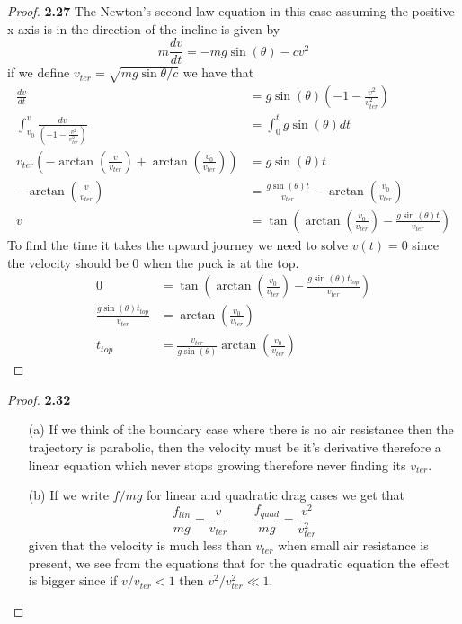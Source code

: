 \documentclass[11pt]{article}
\theoremstyle{definition}
\begin{document}
    \begin{proof}{\textbf{2.27}}
        The Newton's second law equation in this case assuming the positive
        x-axis is in the direction of the incline is given by
        $$m\frac{dv}{dt} = -mg\sin(\theta) - cv^2$$
        if we define $v_{ter} = \sqrt{mg\sin{\theta}/c}$ we have that
        \begin{align*}
            \frac{dv}{dt} &= g\sin(\theta)\left(-1 - \frac{v^2}{v_{ter}^2}\right)\\
            \int_{v_0}^v\frac{dv}{\left(-1 - \frac{v^2}{v_{ter}^2}\right)}
                &= \int_{0}^tg\sin(\theta)dt\\
            v_{ter}\left(-\arctan(\frac{v}{v_{ter}}) + \arctan(\frac{v_{0}}{v_{ter}})\right)
                &= g\sin(\theta)t\\
            -\arctan(\frac{v}{v_{ter}}) &= \frac{g\sin(\theta)t}{v_{ter}} - \arctan(\frac{v_0}{v_{ter}})\\
            v &= \tan(\arctan(\frac{v_0}{v_{ter}}) - \frac{g\sin(\theta)t}{v_{ter}})
        \end{align*}
        To find the time it takes the upward journey we need to solve $v(t)=0$
        since the velocity should be $0$ when the puck is at the top.
        \begin{align*}
            0 &= \tan(\arctan(\frac{v_0}{v_{ter}}) - \frac{g\sin(\theta)t_{top}}{v_{ter}})\\
            \frac{g\sin(\theta)t_{top}}{v_{ter}} &= \arctan(\frac{v_0}{v_{ter}}) \\
            t_{top} &= \frac{v_{ter}}{g\sin(\theta)}\arctan(\frac{v_0}{v_{ter}})
        \end{align*} 
    \end{proof}
    \begin{proof}{\textbf{2.32}}
        \begin{itemize}
            \item[(a)] If we think of the boundary case where there is no air
            resistance then the trajectory is parabolic, then the velocity must
            be it's derivative therefore a linear equation which never stops
            growing therefore never finding its $v_{ter}$.
            \item[(b)] If we write $f/mg$ for linear and quadratic drag cases
            we get that
            $$\frac{f_{lin}}{mg} = \frac{v}{v_{ter}} \quad\quad \frac{f_{quad}}{mg} = \frac{v^2}{v^2_{ter}}$$
            given that the velocity is much less than $v_{ter}$ when small
            air resistance is present, we see from the equations that for the
            quadratic equation the effect is bigger since if $v/v_{ter} < 1$
            then $v^2/v_{ter}^2 \ll 1$.
        \end{itemize}
    \end{proof}
\end{document}
